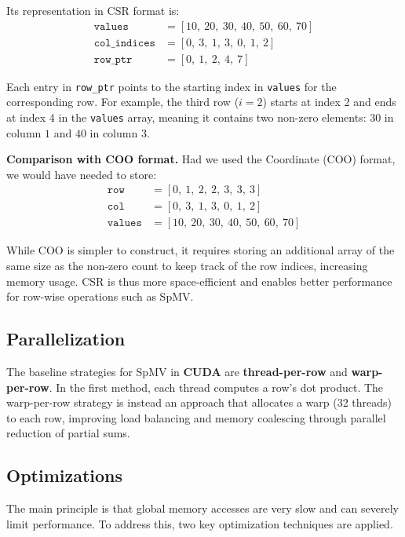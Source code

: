 \documentclass[conference]{IEEEtran}
\begin{document}
Its representation in CSR format is:
\begin{align*}
\texttt{values}      &= [10,\ 20,\ 30,\ 40,\ 50,\ 60,\ 70] \\
\texttt{col\_indices} &= [0,\ 3,\ 1,\ 3,\ 0,\ 1,\ 2] \\
\texttt{row\_ptr}     &= [0,\ 1,\ 2,\ 4,\ 7]
\end{align*}

\noindent Each entry in \texttt{row\_ptr} points to the starting index in \texttt{values} for the corresponding row. For example, the third row ($i=2$) starts at index 2 and ends at index 4 in the \texttt{values} array, meaning it contains two non-zero elements: $30$ in column $1$ and $40$ in column $3$.

\vspace{0.5em}
\noindent\textbf{Comparison with COO format.} Had we used the Coordinate (COO) format, we would have needed to store:
\begin{align*}
\texttt{row}    &= [0,\ 1,\ 2,\ 2,\ 3,\ 3,\ 3] \\
\texttt{col}    &= [0,\ 3,\ 1,\ 3,\ 0,\ 1,\ 2] \\
\texttt{values} &= [10,\ 20,\ 30,\ 40,\ 50,\ 60,\ 70]
\end{align*}

While COO is simpler to construct, it requires storing an additional array of the same size as the non-zero count to keep track of the row indices, increasing memory usage. CSR is thus more space-efficient and enables better performance for row-wise operations such as SpMV.

\subsection{Parallelization}

The baseline strategies for SpMV in \textbf{CUDA} are \textbf{thread-per-row} and \textbf{warp-per-row}. In the first method, each thread computes a row's dot product. The warp-per-row strategy is instead an approach that allocates a warp (32 threads) to each row, improving load balancing and memory coalescing through parallel reduction of partial sums.

\subsection{Optimizations}

The main principle is that global memory accesses are very slow and can severely limit performance. To address this, two key optimization techniques are applied.
\end{document}
